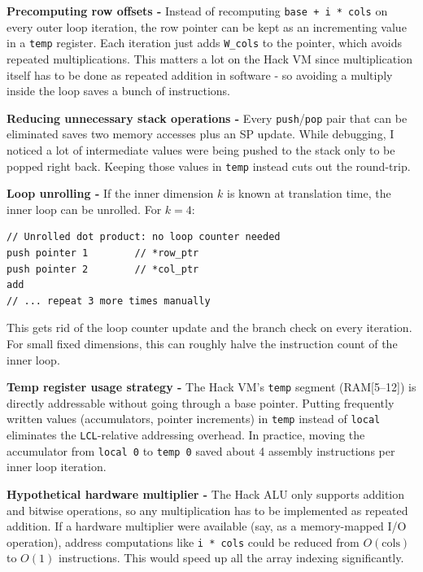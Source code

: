 \documentclass[12pt,a4paper]{article}
\begin{document}
\textbf{Precomputing row offsets -}
Instead of recomputing \texttt{base + i * cols} on every outer loop iteration, the row pointer can be kept as an incrementing value in a \texttt{temp} register. Each iteration just adds \texttt{W\_cols} to the pointer, which avoids repeated multiplications. This matters a lot on the Hack VM since multiplication itself has to be done as repeated addition in software - so avoiding a multiply inside the loop saves a bunch of instructions.

\textbf{Reducing unnecessary stack operations -}
Every \texttt{push}/\texttt{pop} pair that can be eliminated saves two memory accesses plus an SP update. While debugging, I noticed a lot of intermediate values were being pushed to the stack only to be popped right back. Keeping those values in \texttt{temp} instead cuts out the round-trip.

\textbf{Loop unrolling -}
If the inner dimension $k$ is known at translation time, the inner loop can be unrolled. For $k=4$:

\begin{lstlisting}[style=hackvm, caption={Manual loop unrolling for k=4 inner dimension}]
// Unrolled dot product: no loop counter needed
push pointer 1        // *row_ptr
push pointer 2        // *col_ptr
add
// ... repeat 3 more times manually
\end{lstlisting}

This gets rid of the loop counter update and the branch check on every iteration. For small fixed dimensions, this can roughly halve the instruction count of the inner loop.

\textbf{Temp register usage strategy -}
The Hack VM's \texttt{temp} segment (RAM[5--12]) is directly addressable without going through a base pointer. Putting frequently written values (accumulators, pointer increments) in \texttt{temp} instead of \texttt{local} eliminates the \texttt{LCL}-relative addressing overhead. In practice, moving the accumulator from \texttt{local 0} to \texttt{temp 0} saved about 4 assembly instructions per inner loop iteration.

\textbf{Hypothetical hardware multiplier -}
The Hack ALU only supports addition and bitwise operations, so any multiplication has to be implemented as repeated addition. If a hardware multiplier were available (say, as a memory-mapped I/O operation), address computations like \texttt{i * cols} could be reduced from $O(\text{cols})$ to $O(1)$ instructions. This would speed up all the array indexing significantly.
\end{document}
